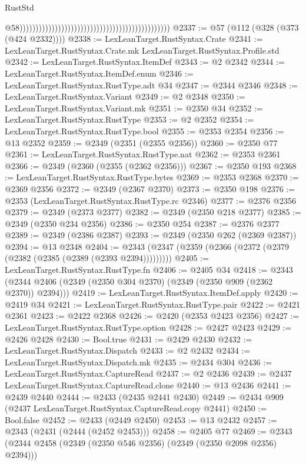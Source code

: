 \begin{lexlean}{RustStd}
\begin{coremodule}
                                                                                                  @58)))))))))))))))))))))))))))))))))))))))))))))))
@2337 := @57 (@112 (@328 (@373 (@424 @2332))))
@2338 := LexLeanTarget.RustSyntax.Crate
@2341 := LexLeanTarget.RustSyntax.Crate.mk LexLeanTarget.RustSyntax.Profile.std
@2342 := LexLeanTarget.RustSyntax.ItemDef
@2343 := @2 @2342
@2344 := LexLeanTarget.RustSyntax.ItemDef.enum
@2346 := LexLeanTarget.RustSyntax.RustType.adt @34
@2347 := @2344 @2346
@2348 := LexLeanTarget.RustSyntax.Variant
@2349 := @2 @2348
@2350 := LexLeanTarget.RustSyntax.Variant.mk
@2351 := @2350 @34
@2352 := LexLeanTarget.RustSyntax.RustType
@2353 := @2 @2352
@2354 := LexLeanTarget.RustSyntax.RustType.bool
@2355 := @2353 @2354
@2356 := @13 @2352
@2359 := @2349 (@2351 (@2355 @2356))
@2360 := @2350 @77
@2361 := LexLeanTarget.RustSyntax.RustType.nat
@2362 := @2353 @2361
@2366 := @2349 (@2360 (@2355 (@2362 @2356)))
@2367 := @2350 @193
@2368 := LexLeanTarget.RustSyntax.RustType.bytes
@2369 := @2353 @2368
@2370 := @2369 @2356
@2372 := @2349 (@2367 @2370)
@2373 := @2350 @198
@2376 := @2353 (LexLeanTarget.RustSyntax.RustType.rc @2346)
@2377 := @2376 @2356
@2379 := @2349 (@2373 @2377)
@2382 := @2349 (@2350 @218 @2377)
@2385 := @2349 (@2350 @234 @2356)
@2386 := @2350 @254
@2387 := @2376 @2377
@2389 := @2349 (@2386 @2387)
@2393 := @2349 (@2350 @262 (@2369 @2387))
@2394 := @13 @2348
@2404 := @2343 (@2347 (@2359 (@2366 (@2372 (@2379 (@2382 (@2385 (@2389 (@2393 @2394)))))))))
@2405 := LexLeanTarget.RustSyntax.RustType.fn
@2406 := @2405 @34
@2418 := @2343 (@2344 @2406 (@2349 (@2350 @304 @2370) (@2349 (@2350 @909 (@2362 @2370)) @2394)))
@2419 := LexLeanTarget.RustSyntax.ItemDef.apply
@2420 := @2419 @34
@2421 := LexLeanTarget.RustSyntax.RustType.pair
@2422 := @2421 @2361
@2423 := @2422 @2368
@2426 := @2420 (@2353 @2423 @2356)
@2427 := LexLeanTarget.RustSyntax.RustType.option
@2428 := @2427 @2423
@2429 := @2426 @2428
@2430 := Bool.true
@2431 := @2429 @2430
@2432 := LexLeanTarget.RustSyntax.Dispatch
@2433 := @2 @2432
@2434 := LexLeanTarget.RustSyntax.Dispatch.mk
@2435 := @2434 @304
@2436 := LexLeanTarget.RustSyntax.CaptureRead
@2437 := @2 @2436
@2439 := @2437 LexLeanTarget.RustSyntax.CaptureRead.clone
@2440 := @13 @2436
@2441 := @2439 @2440
@2444 := @2433 (@2435 @2441 @2430)
@2449 := @2434 @909 (@2437 LexLeanTarget.RustSyntax.CaptureRead.copy @2441)
@2450 := Bool.false
@2452 := @2433 (@2449 @2450)
@2453 := @13 @2432
@2457 := @2343 (@2431 (@2444 (@2452 @2453)))
@2458 := @2405 @77
@2469 := @2343 (@2344 @2458 (@2349 (@2350 @546 @2356) (@2349 (@2350 @2098 @2356) @2394)))

\end{coremodule}
\end{lexlean}
